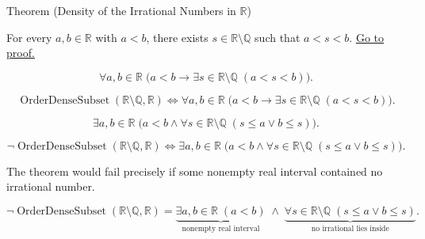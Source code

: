 \begin{theorembox}{Theorem (Density of the Irrational Numbers in $\mathbb{R}$)}
\begin{theorem}
\label{thm:density-of-irrationals-in-reals}
For every $a,b\in\mathbb{R}$ with $a<b$, there exists $s\in\mathbb{R}\setminus\mathbb{Q}$ such that $a<s<b$.
\hyperref[prf:density-of-irrationals-in-reals]{Go to proof.}
\end{theorem}
\end{theorembox}

\begin{remark*}
\[
\forall a,b\in\mathbb{R}\;\bigl(a<b\rightarrow \exists s\in\mathbb{R}\setminus\mathbb{Q}\;(a<s<b)\bigr).
\]
\end{remark*}

\begin{remark*}
\[
\operatorname{OrderDenseSubset}(\mathbb{R}\setminus\mathbb{Q},\mathbb{R})\Longleftrightarrow
\forall a,b\in\mathbb{R}\;\bigl(a<b\rightarrow \exists s\in\mathbb{R}\setminus\mathbb{Q}\;(a<s<b)\bigr).
\]
\end{remark*}

\begin{remark*}
\[
\exists a,b\in\mathbb{R}\;\bigl(a<b\land \forall s\in\mathbb{R}\setminus\mathbb{Q}\;(s\le a\lor b\le s)\bigr).
\]
\end{remark*}

\begin{remark*}
\[
\neg\operatorname{OrderDenseSubset}(\mathbb{R}\setminus\mathbb{Q},\mathbb{R})\Longleftrightarrow
\exists a,b\in\mathbb{R}\;\bigl(a<b\land \forall s\in\mathbb{R}\setminus\mathbb{Q}\;(s\le a\lor b\le s)\bigr).
\]
\end{remark*}

\begin{remark*}
The theorem would fail precisely if some nonempty real interval contained no irrational number.
\end{remark*}

\begin{remark*}
\[
\neg\operatorname{OrderDenseSubset}(\mathbb{R}\setminus\mathbb{Q},\mathbb{R})
=
\underbrace{\exists a,b\in\mathbb{R}\;(a<b)}_{\text{nonempty real interval}}
\;\land\;
\underbrace{\forall s\in\mathbb{R}\setminus\mathbb{Q}\;(s\le a\lor b\le s)}_{\text{no irrational lies inside}}.
\]
\end{remark*}

